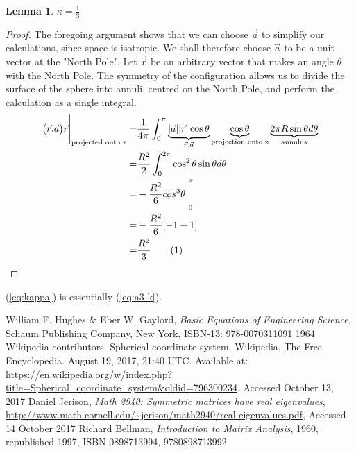 \documentclass[]{article}
\newcommand\numberthis{\addtocounter{equation}{1}\tag{\theequation}}
\newtheorem{lemma}{Lemma}
\begin{document}
\begin{lemma}
	$\kappa=\frac{1}{3}$
\end{lemma}
\begin{proof}
	The foregoing argument shows that we can choose $\vec{a}$ to simplify our calculations, since space is isotropic. We shall therefore choose $\vec{a}$ to be a unit vector at the "North Pole". Let $\vec{r}$ be an arbitrary vector that makes an angle $\theta$ with the North Pole. The symmetry of the configuration allows us to divide the surface of the sphere into annuli, centred on the North Pole, and perform the calculation as a single integral.
	\begin{align*}
	\big(\vec{r}.\vec{a}\big)\vec{r}\Bigg|_\text{projected onto z}=&\frac{1}{4\pi}\int_{0}^{\pi}\underbrace{|\vec{a}||\vec{r}|\cos\theta}_{\vec{r}.\vec{a}}\underbrace{\cos \theta}_{\text{projection onto z}}\underbrace{2\pi R\sin\theta d\theta}_\text{annulus}\\
	=& \frac{R^2}{2}\int_{0}^{2\pi}\cos^2 \theta \sin \theta d \theta\\
	=& - \frac{R^2}{6} cos^3\theta\Bigg |_0^{\pi}\\
	=& - \frac{R^2}{6} [-1-1]\\
	=& \frac{R^2}{3} \numberthis \label{eq:kappa}
	\end{align*}
\end{proof}
(\ref{eq:kappa}) is essentially (\ref{eq:a3-k}).

\begin{thebibliography}{9}\label{section:biblio}
	\raggedright
	William F. Hughes \& Eber W. Gaylord,
	\emph{Basic Equations of Engineering Science},
	Schaum Publishing Company, New York,
	ISBN-13: 978-0070311091
	1964
	Wikipedia contributors. Spherical coordinate system. Wikipedia, The Free Encyclopedia. August 19, 2017, 21:40 UTC. Available at: 
	\url{https://en.wikipedia.org/w/index.php?title=Spherical_coordinate_system&oldid=796300234}.
	Accessed
	October 13, 2017
	Daniel Jerison,
	\emph{Math 2940: Symmetric matrices have real eigenvalues},
	\url{http://www.math.cornell.edu/~jerison/math2940/real-eigenvalues.pdf},
	Accessed 14 October 2017
	Richard Bellman,
	\emph{Introduction to Matrix Analysis},
	1960, republished 1997,
	ISBN	0898713994, 9780898713992
\end{thebibliography}
\end{document}
